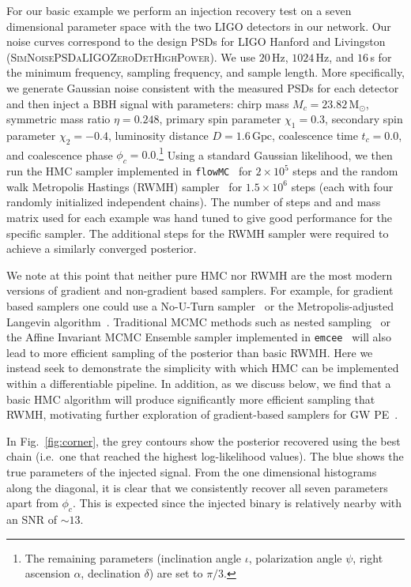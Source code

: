 \documentclass[twocolumn]{aastex631}
\newcommand{\flowMC}{\texttt{flowMC}\xspace}
\begin{document}
For our basic example we perform an injection recovery test on a seven dimensional parameter space with the two LIGO detectors in our network.
Our noise curves correspond to the design PSDs for LIGO Hanford and Livingston (\textsc{SimNoisePSDaLIGOZeroDetHighPower}).
We use $20\,$Hz, $1024\,$Hz, and $16\,$s for the minimum frequency, sampling frequency, and sample length.
More specifically, we generate Gaussian noise consistent with the measured PSDs for each detector and then inject a BBH signal with parameters: chirp mass $M_c = 23.82\,\mathrm{M_\odot}$,  symmetric mass ratio $\eta = 0.248$, primary spin parameter $\chi_1=0.3$, secondary spin parameter $\chi_2=-0.4$, luminosity distance $D = 1.6\,\mathrm{Gpc}$, coalescence time $t_c = 0.0$, and coalescence phase $\phi_c = 0.0$.\footnote{
    The remaining parameters (inclination angle $\iota$, polarization angle $\psi$, right ascension $\alpha$, declination $\delta$) are set to $\pi/3$.
}
Using a standard Gaussian likelihood, we then run the HMC sampler implemented in \flowMC~\citep{2022arXiv221106397W} for $2\times10^5$ steps and the random walk Metropolis Hastings (RWMH) sampler~\citep{1953JChPh..21.1087M} for $1.5\times10^6$ steps (each with four randomly initialized independent chains). 
The number of steps and and mass matrix used for each example was hand tuned to give good performance for the specific sampler.
The additional steps for the RWMH sampler were required to achieve a similarly converged posterior.

We note at this point that neither pure HMC nor RWMH are the most modern versions of gradient and non-gradient based samplers.
For example, for gradient based samplers one could use a No-U-Turn sampler~\citep{2011arXiv1111.4246H} or the Metropolis-adjusted Langevin algorithm~\citep{2013arXiv1309.2983X}.
Traditional MCMC methods such as nested sampling~\citep{Skilling2004, multinest, dynesty} or the Affine Invariant MCMC Ensemble sampler implemented in \texttt{emcee}~\citep{2013PASP..125..306F} will also lead to more efficient sampling of the posterior than basic RWMH.
Here we instead seek to demonstrate the simplicity with which HMC can be implemented within a differentiable pipeline.
In addition, as we discuss below, we find that a basic HMC algorithm will produce significantly more efficient sampling that RWMH, motivating further exploration of gradient-based samplers for GW PE~\citep{PEpaper}.


In Fig.~\ref{fig:corner}, the grey contours show the posterior recovered using the best chain (i.e.~one that reached the highest log-likelihood values).
The blue shows the true parameters of the injected signal.
From the one dimensional histograms along the diagonal, it is clear that we consistently recover all seven parameters apart from $\phi_c$.
This is expected since the injected binary is relatively nearby with an SNR of $\sim13$.
\end{document}
